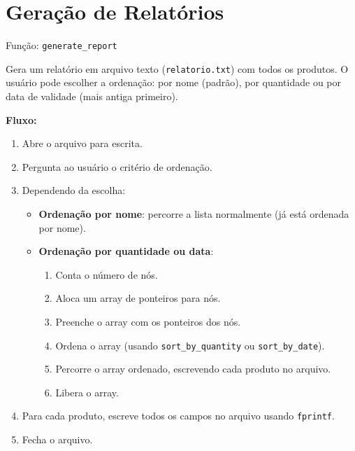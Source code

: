 \documentclass[12pt]{article}
\begin{document}
\section{Geração de Relatórios}
Função: \texttt{generate\_report}

Gera um relatório em arquivo texto (\texttt{relatorio.txt}) com todos os produtos. O usuário pode escolher a ordenação: por nome (padrão), por quantidade ou por data de validade (mais antiga primeiro).

\textbf{Fluxo:}
\begin{enumerate}
    \item Abre o arquivo para escrita.
    \item Pergunta ao usuário o critério de ordenação.
    \item Dependendo da escolha:
        \begin{itemize}
            \item \textbf{Ordenação por nome}: percorre a lista normalmente (já está ordenada por nome).
            \item \textbf{Ordenação por quantidade ou data}: 
                \begin{enumerate}
                    \item Conta o número de nós.
                    \item Aloca um array de ponteiros para nós.
                    \item Preenche o array com os ponteiros dos nós.
                    \item Ordena o array (usando \texttt{sort\_by\_quantity} ou \texttt{sort\_by\_date}).
                    \item Percorre o array ordenado, escrevendo cada produto no arquivo.
                    \item Libera o array.
                \end{enumerate}
        \end{itemize}
    \item Para cada produto, escreve todos os campos no arquivo usando \texttt{fprintf}.
    \item Fecha o arquivo.
\end{enumerate}
\end{document}
